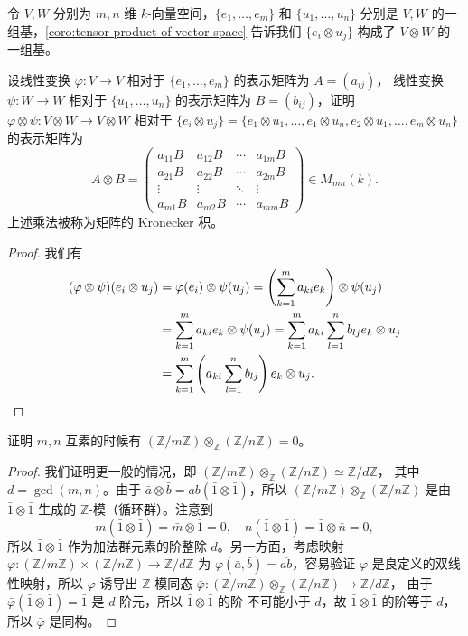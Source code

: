 \begin{problem}
  令 $V,W$ 分别为 $m,n$ 维 $k$-向量空间，$\{e_1,\dots,e_m\}$ 和 $\{u_1,\dots,u_n\}$ 分别是
  $V,W$ 的一组基，\autoref{coro:tensor product of vector space} 告诉我们
  $\{e_i\otimes u_j\}$ 构成了 $V\otimes W$ 的一组基。

  设线性变换 $\varphi:V\to V$ 相对于 $\{e_1,\dots,e_m\}$ 的表示矩阵为 $A=(a_{ij})$，
  线性变换 $\psi:W\to W$ 相对于 $\{u_1,\dots,u_n\}$ 的表示矩阵为 $B=(b_{ij})$，证明
  $\varphi\otimes \psi:V\otimes W\to V\otimes W$ 相对于 $\{e_i\otimes u_j\}=\{e_1\otimes u_1,\dots,e_1\otimes u_n,e_2\otimes u_1,\dots,e_m\otimes u_n\}$ 
  的表示矩阵为
  \[
    A\otimes B=
    \begin{pmatrix}
      a_{11} B & a_{12} B & \cdots  & a_{1m} B \\
      a_{21} B & a_{22} B & \cdots & a_{2m} B \\
      \vdots & \vdots & \ddots & \vdots \\
      a_{m1} B & a_{m2} B & \cdots & a_{mm} B 
    \end{pmatrix}  \in M_{mn}(k).
  \]
  上述乘法被称为矩阵的 Kronecker 积。
\end{problem}
\begin{proof}
  我们有
  \begin{align*}
    (\varphi\otimes \psi)(e_i\otimes u_j) &=
    \varphi(e_i)\otimes \psi(u_j)=\left(\sum_{k=1}^m a_{ki}e_k\right)\otimes \psi(u_j)\\
    &=\sum_{k=1}^m a_{ki}e_k\otimes \psi(u_j)
    =\sum_{k=1}^m a_{ki}\sum_{l=1}^n b_{lj} e_k\otimes u_j \\
    &=\sum_{k=1}^m \left(a_{ki}\sum_{l=1}^n b_{lj}\right)e_k\otimes u_j.\qedhere
  \end{align*}
\end{proof}


\begin{problem}
  证明 $m,n$ 互素的时候有 $(\mathbb{Z}/m\mathbb{Z})\otimes_{\mathbb{Z}}(\mathbb{Z}/n\mathbb{Z})=0$。
\end{problem}
\begin{proof}
  我们证明更一般的情况，即 
  $(\mathbb{Z}/m\mathbb{Z})\otimes_{\mathbb{Z}}(\mathbb{Z}/n\mathbb{Z})\simeq\mathbb{Z}/d\mathbb{Z}$，
  其中 $d=\gcd(m,n)$。由于 $\bar a\otimes \bar b=ab(\bar 1\otimes\bar 1)$，所以
  $(\mathbb{Z}/m\mathbb{Z})\otimes_{\mathbb{Z}}(\mathbb{Z}/n\mathbb{Z})$ 是由 $\bar 1\otimes\bar 1$
  生成的 $\mathbb{Z}$-模（循环群）。注意到
  \[
    m(\bar 1\otimes \bar 1)=\bar m\otimes \bar 1  =0,
    \quad 
    n(\bar 1\otimes \bar 1)=\bar 1\otimes \bar n  =0,
  \]
  所以 $\bar 1\otimes \bar 1$ 作为加法群元素的阶整除 $d$。另一方面，考虑映射
  $\varphi:(\mathbb{Z}/m\mathbb{Z})\times (\mathbb{Z}/n\mathbb{Z})\to\mathbb{Z}/d\mathbb{Z}$
  为 $\varphi(\bar a,\bar b)=\overline{ab}$，容易验证 $\varphi$ 是良定义的双线性映射，所以
  $\varphi$ 诱导出 $\mathbb{Z}$-模同态 
  $\bar\varphi:(\mathbb{Z}/m\mathbb{Z})\otimes_{\mathbb{Z}}
  (\mathbb{Z}/n\mathbb{Z})\to\mathbb{Z}/d\mathbb{Z}$，
  由于 $\bar\varphi(\bar 1\otimes \bar 1)=\bar 1$ 是 $d$ 阶元，所以 $\bar1\otimes\bar 1$ 的阶
  不可能小于 $d$，故 $\bar 1\otimes\bar 1$ 的阶等于 $d$，所以 $\bar\varphi$ 是同构。
\end{proof}


